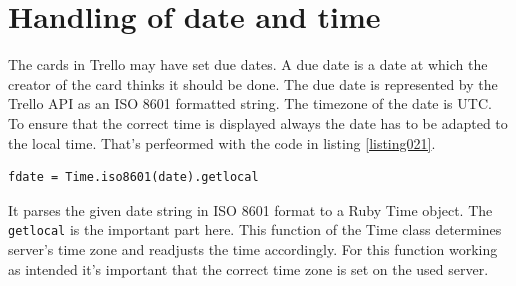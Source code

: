 \section{Handling of date and time}
The cards in Trello may have set due dates. A due date is a date at which the creator of the card thinks it should be done. The due date is represented by the Trello API as an ISO 8601 formatted string. The timezone of the date is UTC. To ensure that the correct time is displayed always the date has to be adapted to the local time. That's perfeormed with the code in listing \ref{listing021}.

\begin{lstlisting}[aboveskip=1\baselineskip, caption=Response of the token request., label=listing021]
fdate = Time.iso8601(date).getlocal
\end{lstlisting}

It parses the given date string in ISO 8601 format to a Ruby Time object. The \lstinline{getlocal} is the important part here. This function of the Time class determines server's time zone and readjusts the time accordingly. For this function working as intended it's important that the correct time zone is set on the used server. 

